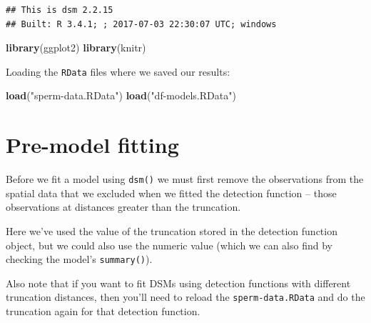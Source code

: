 \documentclass[]{book}
\newenvironment{Shaded}{\begin{snugshade}}{\end{snugshade}}
\newcommand{\KeywordTok}[1]{\textcolor[rgb]{0.13,0.29,0.53}{\textbf{#1}}}
\newcommand{\StringTok}[1]{\textcolor[rgb]{0.31,0.60,0.02}{#1}}
\newcommand{\OperatorTok}[1]{\textcolor[rgb]{0.81,0.36,0.00}{\textbf{#1}}}
\newcommand{\NormalTok}[1]{#1}
\theoremstyle{definition}
\theoremstyle{definition}
\theoremstyle{remark}
\begin{document}
\begin{verbatim}
## This is dsm 2.2.15
## Built: R 3.4.1; ; 2017-07-03 22:30:07 UTC; windows
\end{verbatim}

\begin{Shaded}
\begin{Highlighting}[]
\KeywordTok{library}\NormalTok{(ggplot2)}
\KeywordTok{library}\NormalTok{(knitr)}
\end{Highlighting}
\end{Shaded}

Loading the \texttt{RData} files where we saved our results:

\begin{Shaded}
\begin{Highlighting}[]
\KeywordTok{load}\NormalTok{(}\StringTok{"sperm-data.RData"}\NormalTok{)}
\KeywordTok{load}\NormalTok{(}\StringTok{"df-models.RData"}\NormalTok{)}
\end{Highlighting}
\end{Shaded}

\section{Pre-model fitting}\label{pre-model-fitting}

Before we fit a model using \texttt{dsm()} we must first remove the
observations from the spatial data that we excluded when we fitted the
detection function -- those observations at distances greater than the
truncation.

\begin{Shaded}
\end{Shaded}

Here we've used the value of the truncation stored in the detection
function object, but we could also use the numeric value (which we can
also find by checking the model's \texttt{summary()}).

Also note that if you want to fit DSMs using detection functions with
different truncation distances, then you'll need to reload the
\texttt{sperm-data.RData} and do the truncation again for that detection
function.
\end{document}
